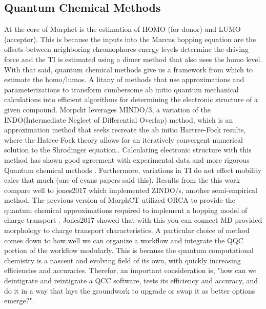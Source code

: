 \subsection{Quantum Chemical Methods}
At the core of Morphct is the estimation of HOMO (for donor) and LUMO (acceptor). This is because 
the inputs into the Marcus hopping equation are the offsets between neighboring  chromophores energy levels
determine the driving force and the TI is estimated using a dimer method that also uses the homo level. 
With that said, quantum chemical methods give us a framework from which to estimate the homo/lumos. A litany of
methods that use approximations and parameterizations to transform cumbersome ab initio quantum mechanical 
calculations into efficient algorithms for determining the electronic structure of a given compound. Morpcht 
leverages MINDO/3, a variation of the INDO(Intermediate Neglect of Differential Overlap) method,
which is an approximation method that seeks recreate the ab initio Hartree-Fock
results, where the Hatree-Fock theory allows for an iteratively convergent numerical solution to the Shrodinger equation.\cite{Thiel2014}. Calculating electronic structure with this method has
shown good agreement with experimental data and more rigorous Quantum chemical
methods 
\cite{Bredas2002}. Furthermore, variations in TI do not effect mobility calcs
that much (one of evans papers said this).  Results
from the this work compare well to jones2017 which implemented ZINDO/s, another
semi-empirical method. The
previous version of MorphCT utilized ORCA to provide the quantum chemical
approximations required to implement
a hopping model of charge transport \cite{Neese2012b}. Jones2017 showed that with this you can connect MD
provided morphology to charge transport characteristics. A particular 
choice of method comes down to how well we can organize a workflow and integrate the QQC portion of the
workflow modularly. This is because the quantum computational chemistry is a nascent and evolving field of its
own, with quickly increasing efficiencies and accuracies. Therefor, an important consideration is, "how can we
deintigrate and reintigrate a QCC software, tests its efficiency and accuracy, and do it in a way that lays
the groundwork to upgrade or swap it as better options emerge?". 

